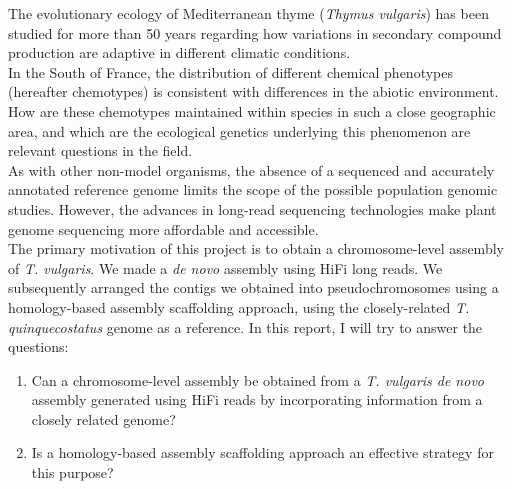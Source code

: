 The evolutionary ecology of Mediterranean thyme (\textit{Thymus vulgaris}) has been studied for more than 50 years regarding how variations in secondary compound production are adaptive in different climatic conditions.~\cite{thompsonPlantTraitsEcological2020}\\

In the South of France, the distribution of different chemical phenotypes (hereafter chemotypes) is consistent with differences in the abiotic environment. How are these chemotypes maintained within species in such a close geographic area, and which are the ecological genetics underlying this phenomenon are relevant questions in the field.~\cite{bataillonGenotypePhenotypeGenetic2022}\\

As with other non-model organisms, the absence of a sequenced and accurately annotated reference genome limits the scope of the possible population genomic studies. However, the advances in long-read sequencing technologies make plant genome sequencing more affordable and accessible.~\cite{puckerPlantGenomeSequence2022} \\

The primary motivation of this project is to obtain a chromosome-level assembly of \textit{T. vulgaris}. We made a \textit{de novo} assembly using \ac{HiFi} long reads. We subsequently arranged the contigs we obtained into pseudochromosomes using a homology-based assembly scaffolding approach, using the closely-related \textit{T. quinquecostatus} genome as a reference. In this report, I will try to answer the questions:

\begin{enumerate}
    \item Can a chromosome-level assembly be obtained from a \textit{T. vulgaris de novo} assembly generated using \ac{HiFi} reads by incorporating information from a closely related genome?
    \item Is a homology-based assembly scaffolding approach an effective strategy for this purpose?
\end{enumerate}

